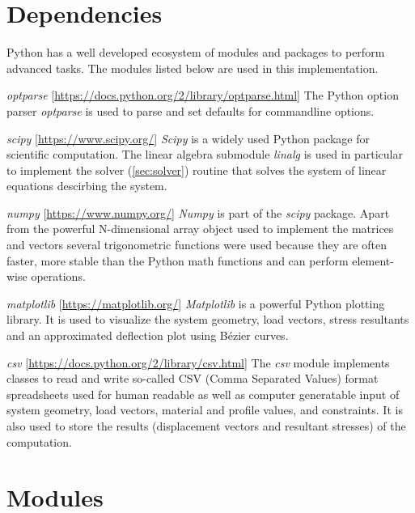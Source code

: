 \section{Dependencies}
\label{sec:depend}

Python has a well developed ecosystem of modules and packages to perform advanced tasks.
The modules listed below are used in this implementation.
\bigskip
 
\textit{optparse} [\url{https://docs.python.org/2/library/optparse.html}] \linebreak
The Python option parser \textit{optparse} is used to parse and set defaults for commandline options.
\bigskip

\textit{scipy} [\url{https://www.scipy.org/}]\linebreak
\textit{Scipy} is a widely used Python package for scientific computation. The linear algebra submodule \textit{linalg} is used in particular to implement the solver (\cref{sec:solver}) routine that solves the system of linear equations descirbing the system.
\bigskip

\textit{numpy} [\url{https://www.numpy.org/}]\linebreak
\textit{Numpy} is part of the \textit{scipy} package. Apart from the powerful N-dimensional array object used to implement the matrices and vectors several trigonometric functions were used because they are often faster, more stable than the Python math functions and can perform element-wise operations.
\bigskip

\textit{matplotlib} [\url{https://matplotlib.org/}]\linebreak
\textit{Matplotlib} is a powerful Python plotting library. It is used to visualize the system geometry, load vectors, stress resultants and an approximated deflection plot using B\'{e}zier curves.
\bigskip

\textit{csv} [\url{https://docs.python.org/2/library/csv.html}]\linebreak
The \textit{csv} module implements classes to read and write so-called CSV (Comma Separated Values) format spreadsheets used for human readable as well as computer generatable input of system geometry, load vectors, material and profile values, and constraints.
It is also used to store the results (displacement vectors and resultant stresses) of the computation.

\pagebreak

\section{Modules}
\label{sec:modules}

